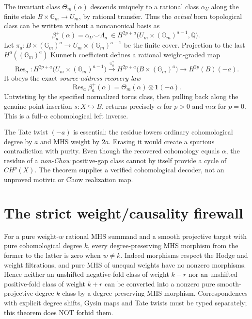 \documentclass[11pt]{article}
\begin{document}
The invariant class $\Theta_m(\alpha)$ descends uniquely
to a rational class $\alpha_U$ along the finite etale
$B\times\mathbb G_m\to U_m$, by rational transfer.
Thus the \emph{actual} born topological class can be
written without a noncanonical basis as
\[
 \boxed{\qquad
 \beta^+_a(\alpha)=\alpha_U\smile\Lambda_a
    \ \in H^{2p+a}\bigl(U_m\times(\mathbb G_m)^{a-1},
                   \mathbb Q\bigr).
 \qquad}                                                \tag{18}
\]
Let $\pi_a:B\times(\mathbb G_m)^a\to
U_m\times(\mathbb G_m)^{a-1}$ be the finite cover.
Projection to the last $H^a((\mathbb G_m)^a)$ Kunneth
coefficient defines a rational weight-graded map
\[
 \operatorname{Res}_a:
 H^{2p+a}\bigl(U_m\times(\mathbb G_m)^{a-1}\bigr)
 \xrightarrow{\pi_a^*}
 H^{2p+a}\bigl(B\times(\mathbb G_m)^a\bigr)
 \longrightarrow H^{2p}(B)(-a).
\]
It obeys the exact \emph{source-address recovery law}
\[
 \boxed{\quad
 \operatorname{Res}_a\beta^+_a(\alpha)
         =\Theta_m(\alpha)\otimes\mathbf1(-a).
 \quad}                                                \tag{19}
\]
Untwisting by the specified normalized torus class,
then pulling back along the genuine point insertion
$s:X\hookrightarrow B$, returns precisely
$\alpha$ for $p>0$ and $m\alpha$ for $p=0$.
This is a full-$\alpha$ cohomological left inverse.

The Tate twist $(-a)$ is essential: the residue lowers
ordinary cohomological degree by $a$ and MHS weight by
$2a$.  Erasing it would create a spurious contradiction
with purity. Even though the recovered cohomology equals
$\alpha$, the residue of a \emph{non-Chow} positive-gap
class cannot by itself provide a cycle of $CH^p(X)$.
The theorem supplies a verified cohomological decoder,
not an unproved motivic or Chow realization map.

\section{The strict weight/causality firewall}
For a pure weight-$w$ rational MHS summand and a
smooth projective target with pure cohomological
degree $k$, every degree-preserving MHS morphism
from the former to the latter is zero when $w\ne k$.
Indeed morphisms respect the Hodge and weight
filtrations, and pure MHS of unequal weights
have no nonzero morphisms. Hence neither an
unshifted negative-fold class of weight $k-r$
nor an unshifted positive-fold class of weight
$k+r$ can be converted into a nonzero pure
smooth-projective degree-$k$ class by a
degree-preserving MHS morphism.
Correspondences with explicit degree shifts,
Gysin maps and Tate twists must be typed
separately; this theorem does NOT forbid them.
\end{document}

